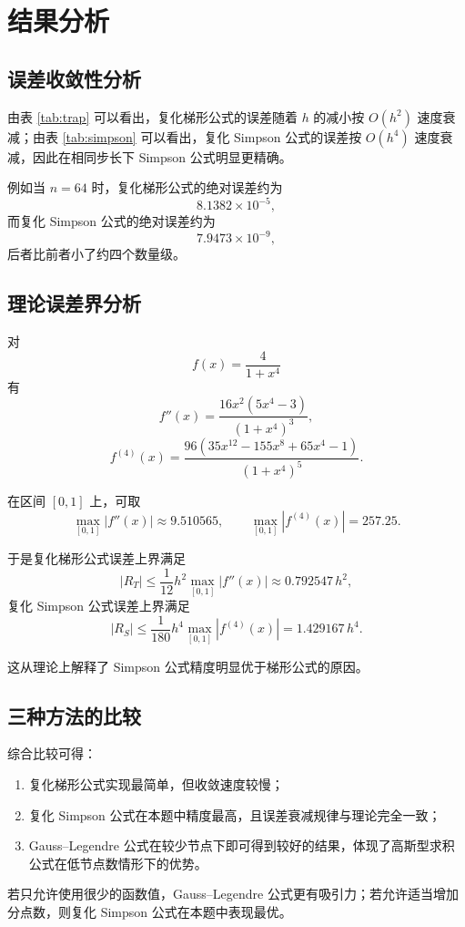 \documentclass[12pt,a4paper]{ctexart}
\begin{document}
\section{结果分析}

\subsection{误差收敛性分析}

由表 \ref{tab:trap} 可以看出，复化梯形公式的误差随着 $h$ 的减小按 $O(h^2)$ 速度衰减；由表 \ref{tab:simpson} 可以看出，复化 Simpson 公式的误差按 $O(h^4)$ 速度衰减，因此在相同步长下 Simpson 公式明显更精确。

例如当 $n=64$ 时，复化梯形公式的绝对误差约为
\[
8.1382\times 10^{-5},
\]
而复化 Simpson 公式的绝对误差约为
\[
7.9473\times 10^{-9},
\]
后者比前者小了约四个数量级。

\subsection{理论误差界分析}

对
\[
f(x)=\frac{4}{1+x^4}
\]
有
\[
f''(x)=\frac{16x^2(5x^4-3)}{(1+x^4)^3},
\]
\[
f^{(4)}(x)=\frac{96(35x^{12}-155x^8+65x^4-1)}{(1+x^4)^5}.
\]

在区间 $[0,1]$ 上，可取
\[
\max_{[0,1]}|f''(x)|\approx 9.510565,
\qquad
\max_{[0,1]}|f^{(4)}(x)|=257.25.
\]

于是复化梯形公式误差上界满足
\[
|R_T|\le \frac{1}{12}h^2\max_{[0,1]}|f''(x)|
\approx 0.792547\,h^2,
\]
复化 Simpson 公式误差上界满足
\[
|R_S|\le \frac{1}{180}h^4\max_{[0,1]}|f^{(4)}(x)|
=1.429167\,h^4.
\]

这从理论上解释了 Simpson 公式精度明显优于梯形公式的原因。

\subsection{三种方法的比较}

综合比较可得：
\begin{enumerate}
    \item 复化梯形公式实现最简单，但收敛速度较慢；
    \item 复化 Simpson 公式在本题中精度最高，且误差衰减规律与理论完全一致；
    \item Gauss--Legendre 公式在较少节点下即可得到较好的结果，体现了高斯型求积公式在低节点数情形下的优势。
\end{enumerate}

若只允许使用很少的函数值，Gauss--Legendre 公式更有吸引力；若允许适当增加分点数，则复化 Simpson 公式在本题中表现最优。
\end{document}
